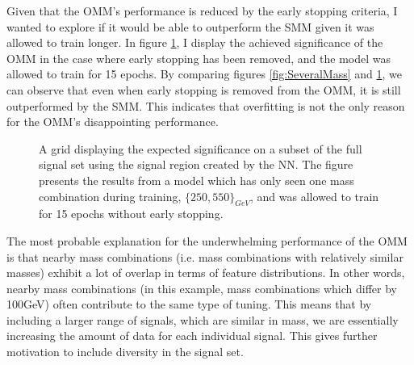Given that the \ac{OMM}'s performance is reduced by the early stopping criteria, I wanted to explore if it would be able to outperform the 
\ac{SMM} given it was allowed to train longer. In figure \ref{fig:NNOverfitting}, I display the achieved significance
of the \ac{OMM} in the case where early stopping has been removed, and the model was allowed to train for 15 epochs. By comparing figures 
\ref{fig:SeveralMass} and \ref{fig:NNOverfitting}, we can observe that even when early stopping is removed from the \ac{OMM}, it is  
still outperformed by the \ac{SMM}. This indicates that overfitting is not the only reason for the \ac{OMM}'s disappointing performance.\\
\begin{figure}[H]
    \centering
    \caption[A grid displaying the expected significance on a subset of the full signal set using the signal region 
    created by a dense \acs{NN} which has trained on one mass, and has been allowed to train for 16 epochs.]{
    A grid displaying the expected significance on a subset of the full signal set using the signal region 
    created by the \ac{NN}. The figure presents the results from a model which has only seen one mass combination 
    during training, $\{250,550\}_{GeV}$, and was allowed to train for 15 epochs without 
    early stopping. }
    \label{fig:NNOverfitting}
\end{figure}
The most probable explanation for the underwhelming performance of the \ac{OMM} is that nearby mass combinations (i.e. mass combinations with 
relatively similar masses) exhibit a lot of overlap in terms of feature distributions. In other words, nearby mass combinations (in this example, mass combinations which 
differ by 100GeV) often contribute to the same type of tuning. This means that by including a larger range of signals, which are similar in mass, we are 
essentially increasing the amount of data for each individual signal. This gives further motivation to include diversity in the signal set.